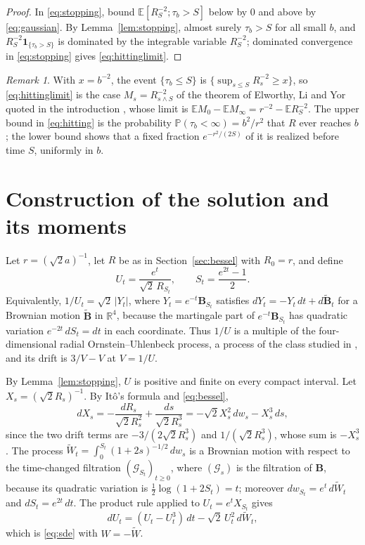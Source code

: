 \documentclass[11pt]{amsart}
\theoremstyle{remark}
\newtheorem{remark}[theorem]{Remark}
\newcommand{\E}{\mathbb E}
\newcommand{\Pp}{\mathbb P}
\newcommand{\R}{\mathbb R}
\begin{document}
\begin{proof}
In \eqref{eq:stopping}, bound $\E[R_S^{-2};\tau_b>S]$ below by $0$ and above by \eqref{eq:gaussian}. By Lemma~\ref{lem:stopping}, almost surely $\tau_b>S$ for all small $b$, and $R_S^{-2}\mathbf 1_{\{\tau_b>S\}}$ is dominated by the integrable variable $R_S^{-2}$; dominated convergence in \eqref{eq:stopping} gives \eqref{eq:hittinglimit}.
\end{proof}

\begin{remark}\label{rem:ely}
With $x=b^{-2}$, the event $\{\tau_b\le S\}$ is $\{\sup_{s\le S}R_s^{-2}\ge x\}$, so \eqref{eq:hittinglimit} is the case $M_s=R_{s\wedge S}^{-2}$ of the theorem of Elworthy, Li and Yor quoted in the introduction \cite[Theorem~1]{ELY97}, whose limit is $\E M_0-\E M_\infty=r^{-2}-\E R_S^{-2}$. The upper bound in \eqref{eq:hitting} is the probability $\Pp(\tau_b<\infty)=b^2/r^2$ that $R$ ever reaches $b$; the lower bound shows that a fixed fraction $e^{-r^2/(2S)}$ of it is realized before time $S$, uniformly in $b$.
\end{remark}

\section{Construction of the solution and its moments}\label{sec:construction}

Let $r=(\sqrt2a)^{-1}$, let $R$ be as in Section~\ref{sec:bessel} with $R_0=r$, and define
\begin{equation}\label{eq:representation}
 U_t=\frac{e^t}{\sqrt2\,R_{S_t}},\qquad S_t=\frac{e^{2t}-1}{2}.
\end{equation}
Equivalently, $1/U_t=\sqrt2\,|Y_t|$, where $Y_t=e^{-t}\mathbf B_{S_t}$ satisfies $dY_t=-Y_t\,dt+d\widetilde{\mathbf B}_t$ for a Brownian motion $\widetilde{\mathbf B}$ in $\R^4$, because the martingale part of $e^{-t}\mathbf B_{S_t}$ has quadratic variation $e^{-2t}\,dS_t=dt$ in each coordinate. Thus $1/U$ is a multiple of the four-dimensional radial Ornstein--Uhlenbeck process, a process of the class studied in \cite{ELY99}, and its drift is $3/V-V$ at $V=1/U$.

By Lemma~\ref{lem:stopping}, $U$ is positive and finite on every compact interval. Let $X_s=(\sqrt2R_s)^{-1}$. By It\^o's formula and \eqref{eq:bessel},
\[
 dX_s=-\frac{dR_s}{\sqrt2R_s^2}+\frac{ds}{\sqrt2R_s^3}=-\sqrt2X_s^2\,dw_s-X_s^3\,ds,
\]
since the two drift terms are $-3/(2\sqrt2R_s^3)$ and $1/(\sqrt2R_s^3)$, whose sum is $-X_s^3$. The process $\widetilde W_t=\int_0^{S_t}(1+2s)^{-1/2}\,dw_s$ is a Brownian motion with respect to the time-changed filtration $(\mathcal G_{S_t})_{t\ge0}$, where $(\mathcal G_s)$ is the filtration of $\mathbf B$, because its quadratic variation is $\frac12\log(1+2S_t)=t$; moreover $dw_{S_t}=e^t\,d\widetilde W_t$ and $dS_t=e^{2t}\,dt$. The product rule applied to $U_t=e^tX_{S_t}$ gives
\[
 dU_t=(U_t-U_t^3)\,dt-\sqrt2\,U_t^2\,d\widetilde W_t,
\]
which is \eqref{eq:sde} with $W=-\widetilde W$.
\end{document}
